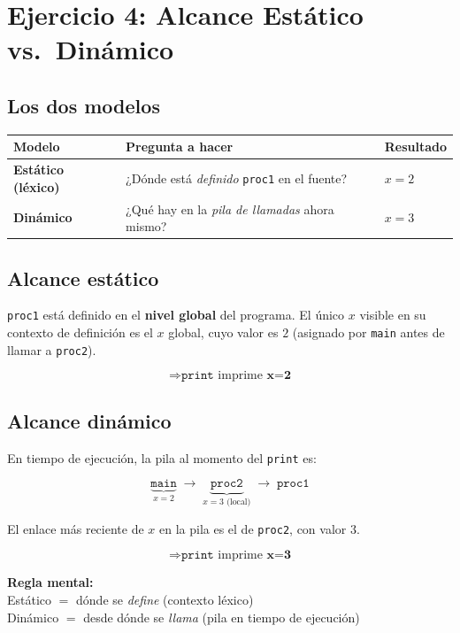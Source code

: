\documentclass[11pt]{article}
\begin{document}
\section{Ejercicio 4: Alcance Estático vs.\ Dinámico}


\subsection*{Los dos modelos}

\begin{center}
\begin{tabular}{lll}
  \toprule
  Modelo & Pregunta a hacer & Resultado \\
  \midrule
  \textbf{Estático (léxico)} &
    ¿Dónde está \emph{definido} \texttt{proc1} en el fuente? &
    $x = 2$ \\
  \textbf{Dinámico} &
    ¿Qué hay en la \emph{pila de llamadas} ahora mismo? &
    $x = 3$ \\
  \bottomrule
\end{tabular}
\end{center}

\subsection*{Alcance estático}

\texttt{proc1} está definido en el \textbf{nivel global} del programa.
El único $x$ visible en su contexto de definición es el $x$ global,
cuyo valor es $2$ (asignado por \texttt{main} antes de llamar a
\texttt{proc2}).

\[
  \Rightarrow \texttt{print} \text{ imprime } \textbf{x=2}
\]

\subsection*{Alcance dinámico}

En tiempo de ejecución, la pila al momento del \texttt{print} es:

\[
  \underbrace{\texttt{main}}_{\displaystyle x=2}
  \;\longrightarrow\;
  \underbrace{\texttt{proc2}}_{\displaystyle x=3 \text{ (local)}}
  \;\longrightarrow\;
  \texttt{proc1}
\]

El enlace más reciente de $x$ en la pila es el de \texttt{proc2},
con valor $3$.

\[
  \Rightarrow \texttt{print} \text{ imprime } \textbf{x=3}
\]

\begin{tcolorbox}
  \textbf{Regla mental:}\\
  Estático $=$ dónde se \emph{define} (contexto léxico)\\
  Dinámico $=$ desde dónde se \emph{llama} (pila en tiempo de ejecución)
\end{tcolorbox}
\end{document}
